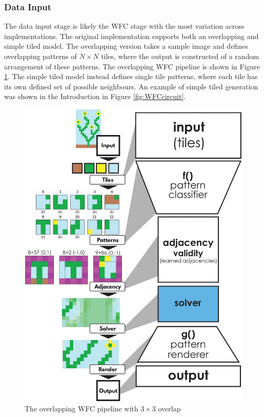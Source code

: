 \subsubsection{Data Input}
The data input stage is likely the WFC stage with the most variation across implementations. The original implementation \cite{Gumin_Wave_Function_Collapse_2016} supports both an overlapping and simple tiled model. The overlapping version takes a sample image and defines overlapping patterns of \(N\times N\) tiles, where the output is constructed of a random arrangement of these patterns. The overlapping WFC pipeline is shown in Figure \ref{fig:overlappingWFC}. The simple tiled model instead defines single tile patterns, where each tile has its own defined set of possible neighbours. An example of simple tiled generation was shown in the Introduction in Figure \ref{fig:WFCcircuit}.

\begin{figure}[H]
    \centering
    \includegraphics[width=\textwidth, height=0.5\textheight, keepaspectratio]{Images/OverlappingWFC.jpg}
    \caption{The overlapping WFC pipeline with \(3\times 3\) overlap \cite{WFC_ConstraintSolving_and_ML}}
    \label{fig:overlappingWFC}
\end{figure}

